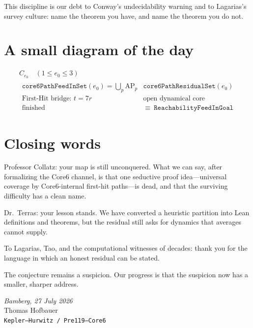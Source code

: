 \documentclass[11pt,a4paper]{article}
\theoremstyle{definition}
\theoremstyle{remark}
\newcommand{\FeedIn}{\mathtt{core6PathFeedInSet}}
\newcommand{\Residual}{\mathtt{core6PathResidualSet}}
\begin{document}
This discipline is our debt to Conway's undecidability warning and to
Lagarias's survey culture: name the theorem you have, and name the theorem
you do not.

\section{A small diagram of the day}

\[
\begin{array}{c}
C_{e_0}\quad(1\le e_0\le 3)\\[0.4em]
\hline
\begin{array}{c|c}
\FeedIn(e_0)=\bigcup_p\mathrm{AP}_p
&
\Residual(e_0)\\[0.3em]
\text{First-Hit bridge: }t=7r
&
\text{open dynamical core}\\[0.2em]
\text{finished}
&
\equiv\ \mathtt{ReachabilityFeedInGoal}
\end{array}
\end{array}
\]

\section{Closing words}

Professor Collatz: your map is still unconquered.
What we can say, after formalizing the Core6 channel, is that one seductive
proof idea---universal coverage by Core6-internal first-hit paths---is dead,
and that the surviving difficulty has a clean name.

Dr.~Terras: your lesson stands.
We have converted a heuristic partition into Lean definitions and theorems,
but the residual still asks for dynamics that averages cannot supply.

To Lagarias, Tao, and the computational witnesses of decades:
thank you for the language in which an honest residual can be stated.

The conjecture remains a suspicion.
Our progress is that the suspicion now has a smaller, sharper address.

\vspace{1.2em}
\begin{flushright}
\textit{Bamberg, 27 July 2026}\\
Thomas Hofbauer\\
\texttt{Kepler--Hurwitz / Pre119--Core6}
\end{flushright}
\end{document}
